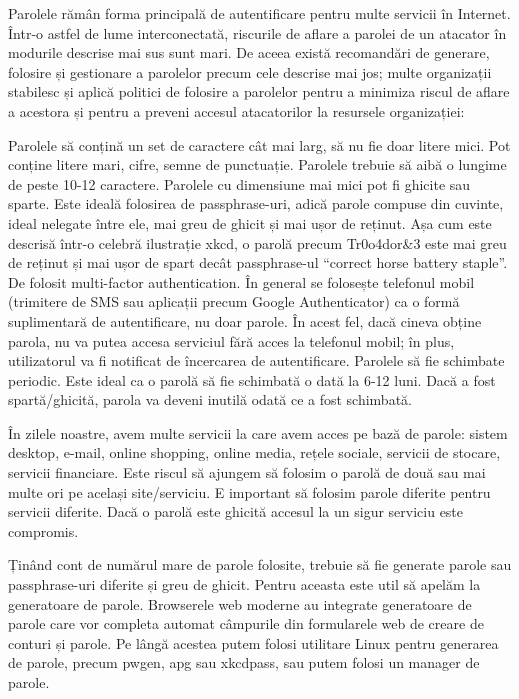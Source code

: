 Parolele rămân forma principală de autentificare pentru multe servicii în Internet. Într-o astfel de lume interconectată, riscurile de aflare a parolei de un atacator în modurile descrise mai sus sunt mari. De aceea există recomandări de generare, folosire și gestionare a parolelor precum cele descrise mai jos; multe organizații stabilesc și aplică politici de folosire a parolelor pentru a minimiza riscul de aflare a acestora și pentru a preveni accesul atacatorilor la resursele organizației:

Parolele să conțină un set de caractere cât mai larg, să nu fie doar litere mici. Pot conține litere mari, cifre, semne de punctuație.
Parolele trebuie să aibă o lungime de peste 10-12 caractere. Parolele cu dimensiune mai mici pot fi ghicite sau sparte. Este ideală folosirea de passphrase-uri, adică parole compuse din cuvinte, ideal nelegate între ele, mai greu de ghicit și mai ușor de reținut. Așa cum este descrisă într-o celebră ilustrație xkcd, o parolă precum Tr0o\ub4dor&3 este mai greu de reținut și mai ușor de spart decât passphrase-ul “correct horse battery staple”.
De folosit multi-factor authentication. În general se folosește telefonul mobil (trimitere de SMS sau aplicații precum Google Authenticator) ca o formă suplimentară de autentificare, nu doar parole. În acest fel, dacă cineva obține parola, nu va putea accesa serviciul fără acces la telefonul mobil; în plus, utilizatorul va fi notificat de încercarea de autentificare.
Parolele să fie schimbate periodic. Este ideal ca o parolă să fie schimbată o dată la 6-12 luni. Dacă a fost spartă/ghicită, parola va deveni inutilă odată ce a fost schimbată.

În zilele noastre, avem multe servicii la care avem acces pe bază de parole: sistem desktop, e-mail, online shopping, online media, rețele sociale, servicii de stocare, servicii financiare. Este riscul să ajungem să folosim o parolă de două sau mai multe ori pe același site/serviciu. E important să folosim parole diferite pentru servicii diferite. Dacă o parolă este ghicită accesul la un sigur serviciu este compromis.

Ținând cont de numărul mare de parole folosite, trebuie să fie generate parole sau passphrase-uri diferite și greu de ghicit. Pentru aceasta este util să apelăm la generatoare de parole. Browserele web moderne au integrate generatoare de parole care vor completa automat câmpurile din formularele web de creare de conturi și parole. Pe lângă acestea putem folosi utilitare Linux pentru generarea de parole, precum pwgen, apg sau xkcdpass, sau putem folosi un manager de parole.

